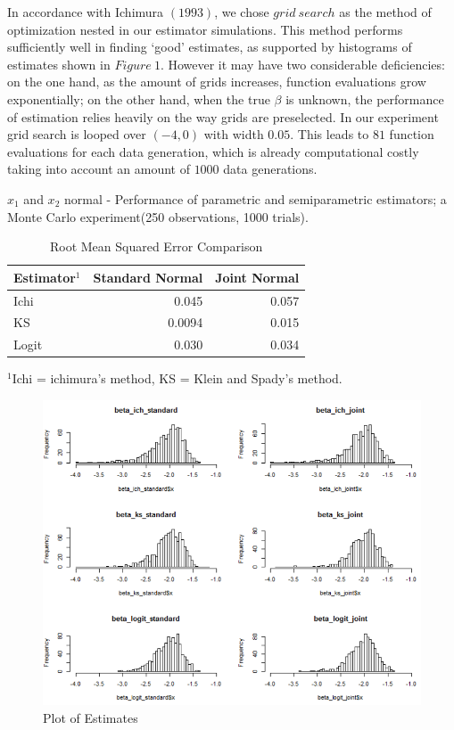 \documentclass[a4paper]{article}
\begin{document}
In accordance with Ichimura $(1993)$, we chose $grid\ search$ as the method of optimization nested in our estimator simulations. This method performs sufficiently well in finding `good' estimates, as supported by histograms of estimates shown in $Figure\ 1$. However it may have two considerable deficiencies: on the one hand, as the amount of grids increases, function evaluations grow exponentially; on the other hand, when the true $\beta$ is unknown, the performance of estimation relies heavily on the way grids are preselected. In our experiment grid search is looped over $(-4,0)$ with width $0.05$. This leads to $81$ function evaluations for each data generation, which is already computational costly taking into account an amount of $1000$ data generations.

\begin{table}[H]
\caption {Root Mean Squared Error Comparison} \label{tab:mean squared error}

$x_1$ and $x_2$ normal - Performance of parametric and semiparametric estimators; a Monte Carlo experiment(250 observations, 1000 trials).
\centering
\begin{tabular}{l r r}

\toprule
Estimator$^1$ & \textbf{Standard Normal} & \textbf{Joint Normal} \tabularnewline\midrule
Ichi & 0.045 & 0.057
\tabularnewline
KS & 0.0094 & 0.015
\tabularnewline 
Logit & 0.030  & 0.034
\tabularnewline
\bottomrule
\end{tabular}

$^1$Ichi = ichimura's method, KS = Klein and Spady's method.

\end{table}

\begin{figure}[h!]
  \caption{Plot of Estimates}
  \includegraphics[width=\linewidth]{plot_comparison.png}
 
  \label{fig:plot of estimates}
\end{figure}
\end{document}

